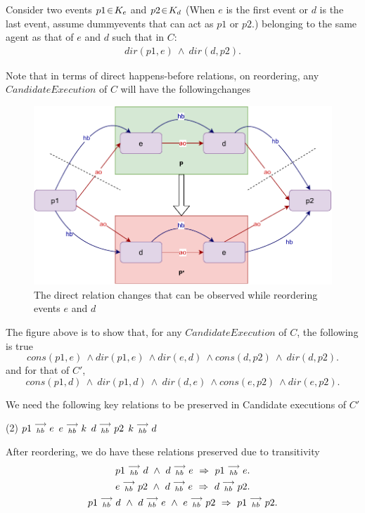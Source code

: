     Consider two events $p1\!\in\!K_e$ and $p2\!\in\!K_d$ (When $e$ is the first event or $d$ is the last event, assume dummyevents that can act as $p1$ or $p2$.) belonging to the same agent as that of $e$ and $d$ such that in $C$:
    \begin{align*}
        dir(p1,e)\ \wedge\ dir(d,p2).
    \end{align*}
    
    Note that in terms of direct happens-before relations, on reordering, any $Candidate Execution$ of $C$ will have the followingchanges
    \begin{figure}[H]
        \centering
        \includegraphics[scale=0.7]{Q1(b).pdf}
        \caption{The direct relation changes that can be observed while reordering events $e$ and $d$}
        \label{fig:my_label}
    \end{figure}
    
    The figure above is to show that, for any $Candidate Execution$ of $C$, the following is true
    \[
        cons(p1,e) \ \wedge dir(p1,e) \ \wedge dir(e,d) \ \wedge cons(d,p2) \ \wedge \ dir(d,p2).
    \]
    and for that of $C'$,
    \[
        cons(p1,d) \ \wedge \ dir(p1,d) \ \wedge \ dir(d,e) \ \wedge cons(e,p2) \ \wedge dir(e,p2).
    \]
    
    We need the following key relations to be preserved in Candidate executions of $C'$ 
    \begin{tasks}(2)
        \task $p1\stackrel{\longrightarrow}{_{hb}}e$
        \task $e\stackrel{\longrightarrow}{_{hb}}k$
        \task $d\stackrel{\longrightarrow}{_{hb}}p2$
        \task $k\stackrel{\longrightarrow}{_{hb}}d$ 
    \end{tasks}

    After reordering, we do have these relations preserved due to transitivity  
    \begin{gather*}
        \reln{p1}{hb}{d} \ \wedge \ \reln{d}{hb}{e} \ \Rightarrow \ \reln{p1}{hb}{e}. \\
        \reln{e}{hb}{p2} \ \wedge \ \reln{d}{hb}{e} \ \Rightarrow \ \reln{d}{hb}{p2}. \\
        \reln{p1}{hb}{d} \ \wedge \ \reln{d}{hb}{e} \ \wedge \ \reln{e}{hb}{p2} \ \Rightarrow \ \reln{p1}{hb}{p2}. 
    \end{gather*}


